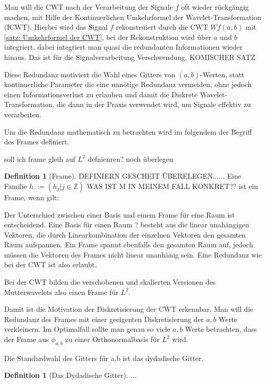 \documentclass[a4paper,11pt,bibliography=totoc,listof=totoc,headinclude=true,cleardoublepage=empty,oneside]{scrbook}
\theoremstyle{definition}
\newtheorem{definition}[theorem]{Definition}
\theoremstyle{remark}
\begin{document}
  Man will die CWT nach der Verarbeitung der Signale $f$ oft wieder rückgängig machen, mit Hilfe der 
  Kontinuerlichen Umkehrformel der Wavelet-Transformation (ICWT). Hierbei wird das Signal $f$ rekonstruiert
  durch die CWT $Wf(a,b)$ mit \ref{satz: Umkehrformel der CWT}, bei der Rekonstruktion wird über $a$ und $b$ integriert, 
  dabei integriert man quasi die redundanten Informationen wieder hinaus. Das ist für die 
  Signalverarbeitung Verschwendung.
  KOMISCHER SATZ 

  Diese Redundanz motiviert die Wahl eines Gitters von $(a,b)$-Werten, statt kontinuerliche Parameter
  die eine unnötige Redundanz vermeiden, ohne jedoch einen Informationsverlust zu erlauben und damit 
  die Diskrete Wavelet-Transformation, die dann in der Praxis verwendet wird, um Signale effektiv zu verarbeiten.


  Um die Redundanz mathematisch zu betrachten wird im folgendem der Begriff des Frames definiert.


  soll ich frame gleih auf $L^2$ defnienren? noch überlegen
  \begin{definition}[Frame]
    DEFINIERN GESCHEIT ÜBERELEGEN......
    Eine Familie $h_\cdot := (h_j | j \in \mathbb{Z})$ WAS IST M IN MEINEM FALL KONKRET?? 
    ist ein Frame, wenn gilt: 
  \end{definition}  


  Der Unterschied zwischen einer Basis und einem Frame für eine Raum ist entscheidend. 
  Eine Basis für einen Raum ? besteht aus die linear unahängigen Vektoren, die durch 
  Linearkombination der einzelnen Vektoren den gesamten Raum aufspannen. 
  Ein Frame spannt ebenfalls den gesamten Raum auf, jedoch müssen die Vektoren des Frames
  nicht linear unanhänig sein. Eine Redundanz wie bei der CWT ist also erlaubt. 

  Bei der CWT bilden die verschobenen und skalierten Versionen des Mutterwavelets also einen Frame für $L^2$.

  Damit ist die Motivation der Diskretisierung der CWT erkennbar. Man will die Redundanz des 
  Frames mit einer geeigenten Diskretisierung der $a,b$ Werte verkleinern. Im Optimalfall
  sollte man genau so viele $a,b$ Werte betrachten, dass der Frame aus $\phi_{a,b}$ zu einer Orthonormalbasis
  für $L^2$ wird.

  Die Standardwahl des Gitters für a,b ist das dydadische Gitter.

  \begin{definition}[Das Dydadische Gitter]
    ...
  \end{definition}
\end{document}
